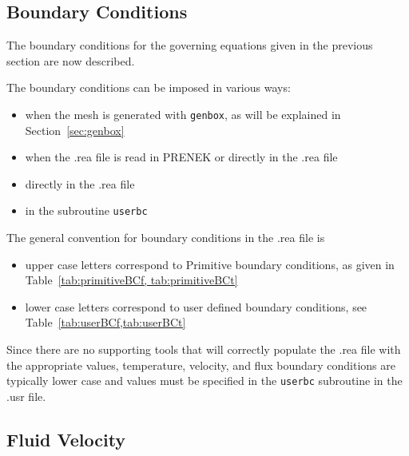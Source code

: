 
\subsection{Boundary Conditions}\label{sec:boundary}

The boundary conditions for the governing equations
given in the previous section are now described.

The boundary conditions can be imposed in various ways:
\begin{itemize}
\item when the mesh is generated with \texttt{genbox}, as will be explained in Section~\ref{sec:genbox}
\item when the .rea file is read in PRENEK or directly in the .rea file
\item directly in the .rea file
\item in the subroutine \texttt{userbc} 
\end{itemize} 

The general convention for boundary conditions in the .rea file is 
\begin{itemize}
\item upper case letters correspond to Primitive boundary conditions, as given in Table~\ref{tab:primitiveBCf, tab:primitiveBCt}
\item lower case letters correspond to user defined boundary conditions, see Table~\ref{tab:userBCf,tab:userBCt}
\end{itemize}

Since there are no supporting tools that will correctly populate the .rea file with the appropriate values, temperature, velocity, and flux boundary conditions are typically lower case and values must be specified in the \texttt{userbc} subroutine in the .usr file. %
\subsection{Fluid Velocity}
  

